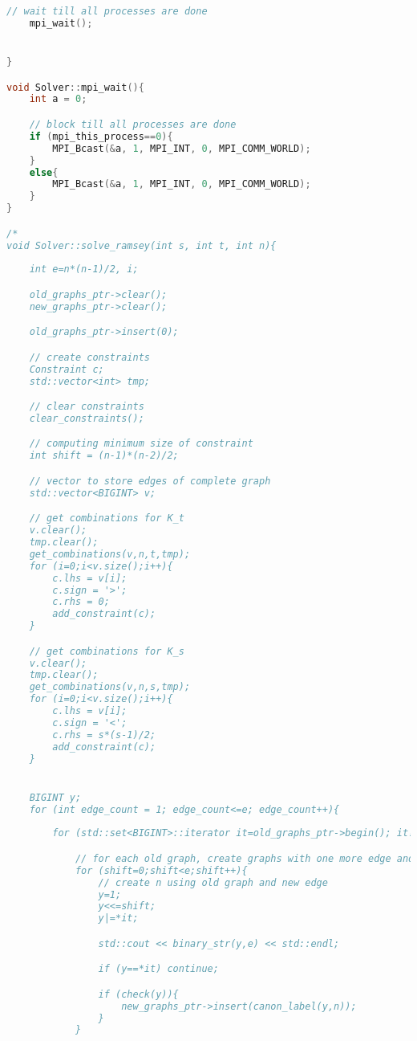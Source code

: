 \documentclass[12pt]{etsu_thesis}
\begin{document}
\begin{lstlisting}[language=C++]
    // wait till all processes are done
    mpi_wait();


}

void Solver::mpi_wait(){
    int a = 0;

    // block till all processes are done
    if (mpi_this_process==0){
        MPI_Bcast(&a, 1, MPI_INT, 0, MPI_COMM_WORLD);
    }
    else{
        MPI_Bcast(&a, 1, MPI_INT, 0, MPI_COMM_WORLD);
    }
}

/*
void Solver::solve_ramsey(int s, int t, int n){
    
    int e=n*(n-1)/2, i;

    old_graphs_ptr->clear();
    new_graphs_ptr->clear();

    old_graphs_ptr->insert(0);

    // create constraints
    Constraint c;
    std::vector<int> tmp;

    // clear constraints
    clear_constraints();

    // computing minimum size of constraint
    int shift = (n-1)*(n-2)/2;

    // vector to store edges of complete graph
    std::vector<BIGINT> v;    

    // get combinations for K_t 
    v.clear();
    tmp.clear();
    get_combinations(v,n,t,tmp);
    for (i=0;i<v.size();i++){
        c.lhs = v[i];
        c.sign = '>';
        c.rhs = 0;
        add_constraint(c);
    }

    // get combinations for K_s 
    v.clear();
    tmp.clear();    
    get_combinations(v,n,s,tmp);
    for (i=0;i<v.size();i++){
        c.lhs = v[i];
        c.sign = '<';
        c.rhs = s*(s-1)/2;
        add_constraint(c);
    }    


    BIGINT y;
    for (int edge_count = 1; edge_count<=e; edge_count++){
        
        for (std::set<BIGINT>::iterator it=old_graphs_ptr->begin(); it!=old_graphs_ptr->end(); ++it){

            // for each old graph, create graphs with one more edge and check
            for (shift=0;shift<e;shift++){
                // create n using old graph and new edge
                y=1;
                y<<=shift;
                y|=*it;

                std::cout << binary_str(y,e) << std::endl;

                if (y==*it) continue;

                if (check(y)){
                    new_graphs_ptr->insert(canon_label(y,n));
                }                
            }
        


\end{lstlisting}
\end{document}
